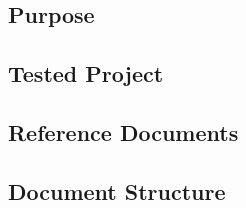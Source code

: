 \subsection{Purpose}
\label{sect:introduction:purpose}


\subsection{Tested Project}
\label{sect:introduction:testedsystem}


\subsection{Reference Documents}
\label{sect:introduction:refdocs}


\subsection{Document Structure}
\label{sect:introduction:docstructure}
